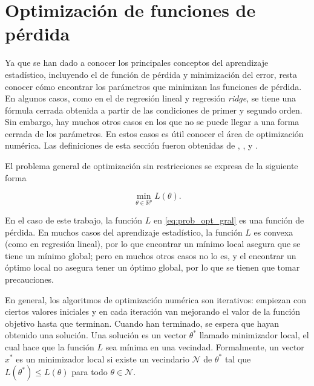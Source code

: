 
\section{Optimización de funciones de pérdida}

Ya que se han dado a conocer los principales conceptos del aprendizaje estadístico, incluyendo el de función de pérdida y minimización del error, resta conocer cómo encontrar los parámetros que minimizan las funciones de pérdida. En algunos casos, como en el de regresión lineal y regresión \textit{ridge}, se tiene una fórmula cerrada obtenida a partir de las condiciones de primer y segundo orden. Sin embargo, hay muchos otros casos en los que no se puede llegar a una forma cerrada de los parámetros. En estos casos es útil conocer el área de optimización numérica. Las definiciones de esta sección fueron obtenidas de \cite{1606.04838}, \cite{johnson2013accelerating}, \cite{nocedal2006numerical} y \cite{roux2012stochastic}.

El problema general de optimización sin restricciones se expresa de la siguiente forma

\begin{equation}
  \label{eq:prob_opt_gral}
  \min_{\theta \in \mathbb{R}^p} L(\theta).
\end{equation}

En el caso de este trabajo, la función $L$ en \ref{eq:prob_opt_gral} es una función de pérdida. En muchos casos del aprendizaje estadístico, la función $L$ es convexa (como en regresión lineal), por lo que encontrar un mínimo local asegura que se tiene un mínimo global; pero en muchos otros casos no lo es, y el encontrar un óptimo local no asegura tener un óptimo global, por lo que se tienen que tomar precauciones.

En general, los algoritmos de optimización numérica son iterativos: empiezan con ciertos valores iniciales y en cada iteración van mejorando el valor de la función objetivo hasta que terminan. Cuando han terminado, se espera que hayan obtenido una solución. Una solución es un vector $\theta^*$ llamado minimizador local, el cual hace que la función $L$ sea mínima en una vecindad. Formalmente, un vector $x^*$ es un minimizador local si existe un vecindario $\mathcal{N}$ de $\theta^*$ tal que $L(\theta^*) \leq L(\theta)$ para todo $\theta \in \mathcal{N}$.

